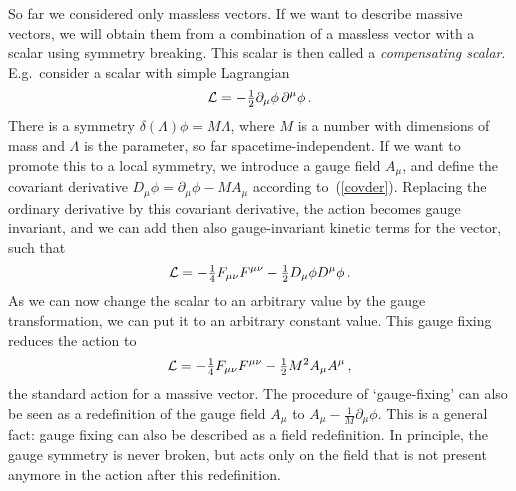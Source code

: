 \documentclass[a4paper,11pt,twoside]{article}
\newcommand{\Red}[1]{#1}
\newcommand{\OliveGreen}[1]{#1}
\newcommand{\RawSienna}[1]{#1}
\newcommand{\Blue}[1]{#1}
\newcommand{\ft}[2]{{\textstyle\frac{#1}{#2}}}
\begin{document}
So far we considered only massless vectors. If we want to describe
massive vectors, we will obtain them from a combination of a massless
vector with a scalar using symmetry breaking. This scalar is then called
a \emph{compensating scalar}. E.g.\ consider a scalar with simple
Lagrangian
\begin{equation}
  {\cal L}=-\ft12 \partial _\mu \Red{\phi}\,\partial ^ \mu\Red{\phi}\,.
 \label{Lscalar}
\end{equation}
There is a symmetry $\delta(\Lambda) \Red{\phi} =M\OliveGreen{\Lambda}$,
where $M$ is a number with dimensions of mass and $\Lambda $ is the
parameter, so far spacetime-independent. If we want to promote this to a
local symmetry, we introduce a gauge field $\Blue{A_\mu}$, and define the
covariant derivative $\RawSienna{D_\mu \phi} =\partial _\mu \Red{\phi}
-M\Blue{A_\mu}$ according to~(\ref{covder}). Replacing the ordinary
derivative by this covariant derivative, the action becomes gauge
invariant, and we can add then also gauge-invariant kinetic terms for the
vector, such that
\begin{equation}
  {\cal L}=-\ft14 \RawSienna{F_{\mu \nu }F^{\mu \nu }}-\ft12\RawSienna{D_\mu \phi D^\mu \phi}
  \,.
 \label{L10}
\end{equation}
As we can now change the scalar to an arbitrary value by the gauge
transformation, we can put it to an arbitrary constant value. This gauge
fixing reduces the action to
\begin{equation}
  {\cal L}=-\ft14 \RawSienna{F_{\mu \nu }F^{\mu \nu }}-\ft12M^2\Blue{A_\mu
  A^\mu}\,,
 \label{Lmassive1}
\end{equation}
the standard action for a massive vector. The procedure of `gauge-fixing'
can also be seen as a redefinition of the gauge field $\Blue{A_\mu }$ to
$\Blue{A_\mu }-\frac{1}{M}\partial _\mu \Red{\phi}$. This is a general
fact: gauge fixing can also be described as a field redefinition. In
principle, the gauge symmetry is never broken, but acts only on the field
that is not present anymore in the action after this redefinition.
\end{document}
